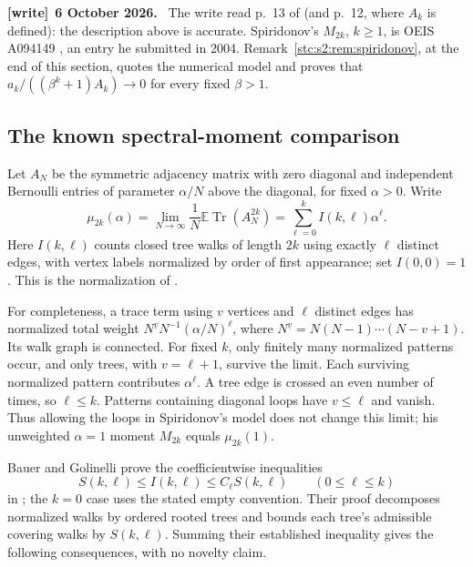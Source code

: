 \documentclass[11pt,letterpaper]{article}
\numberwithin{equation}{section}
\theoremstyle{remark}\newtheorem{remark}[theorem]{Remark}
\newcommand{\E}{\mathbb E}
\newenvironment{writenote}[1][]{\par\smallskip\begingroup\small
 \noindent\textbf{[write]}\if\relax\detokenize{#1}\relax\else~\textbf{#1.}\fi\ }%
 {\par\endgroup\smallskip}
\begin{document}
\begin{writenote}[6 October 2026]
The write read p.~13 of \cite{spiridonov} (and p.~12, where $A_k$ is defined): the description above is accurate. Spiridonov's $M_{2k}$, $k\ge1$, is OEIS A094149 \cite{oeisA094149}, an entry he submitted in 2004. Remark~\ref{stc:s2:rem:spiridonov}, at the end of this section, quotes the numerical model and proves that $a_k/((\beta^k+1)A_k)\to0$ for every fixed $\beta>1$.
\end{writenote}

\subsection{The known spectral-moment comparison}\label{stc:s2:sec:known-spectral}
Let $A_N$ be the symmetric adjacency matrix with zero diagonal and independent Bernoulli entries of parameter $\alpha/N$ above the diagonal, for fixed $\alpha>0$. Write
\begin{equation}\label{stc:s2:eq:moment-normalization}
 \mu_{2k}(\alpha)=\lim_{N\to\infty}\frac1N\E\operatorname{Tr}(A_N^{2k})
 =\sum_{\ell=0}^k I(k,\ell)\alpha^\ell.
\end{equation}
Here $I(k,\ell)$ counts closed tree walks of length $2k$ using exactly $\ell$ distinct edges, with vertex labels normalized by order of first appearance; set $I(0,0)=1$. This is the normalization of \cite[Section~5.3]{bauer}.

For completeness, a trace term using $v$ vertices and $\ell$ distinct edges has normalized total weight $N^{\underline v}N^{-1}(\alpha/N)^\ell$, where $N^{\underline v}=N(N-1)\cdots(N-v+1)$. Its walk graph is connected. For fixed $k$, only finitely many normalized patterns occur, and only trees, with $v=\ell+1$, survive the limit. Each surviving normalized pattern contributes $\alpha^\ell$. A tree edge is crossed an even number of times, so $\ell\le k$. Patterns containing diagonal loops have $v\le\ell$ and vanish. Thus allowing the loops in Spiridonov's model does not change this limit; his unweighted $\alpha=1$ moment $M_{2k}$ equals $\mu_{2k}(1)$.

Bauer and Golinelli prove the coefficientwise inequalities
\begin{equation}\label{stc:s2:eq:known-coeff-bound}
 S(k,\ell)\le I(k,\ell)\le C_\ell S(k,\ell)
 \qquad(0\le\ell\le k)
\end{equation}
in \cite[Section~5.5, equation~(9), pp.~26--30]{bauer}; the $k=0$ case uses the stated empty convention. Their proof decomposes normalized walks by ordered rooted trees and bounds each tree's admissible covering walks by $S(k,\ell)$. Summing their established inequality gives the following consequences, with no novelty claim.
\end{document}
